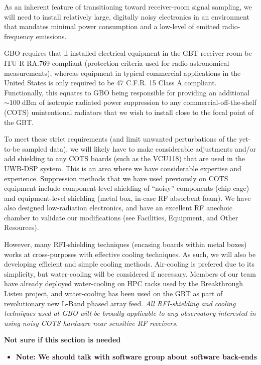\documentclass[10pt]{myNSF}
\begin{document}
As an inherent feature of transitioning toward receiver-room signal
sampling, we will need to install relatively large, digitally noisy
electronics in an environment that mandates minimal power consumption
and a low-level of emitted radio-frequency emissions.

GBO requires that ll installed electrical equipment in the GBT
receiver room be ITU-R RA.769 compliant (protection criteria used for
radio astronomical measurements), whereas equipment in typical
commercial applications in the United States is only required to be 47
C.F.R. 15 Class A compliant. Functionally, this equates to GBO being
responsible for providing an additional $\sim 100\; \mathrm{dBm}$ of
isotropic radiated power suppression to any commercial-off-the-shelf
(COTS) unintentional radiators that we wish to install close to the
focal point of the GBT.  

To meet these strict requirements (and limit unwanted perturbations of
the yet-to-be sampled data), we will likely have to make considerable
adjustments and/or add shielding to any COTS boards (such as the
VCU118) that are used in the UWB-DSP system.  This is an area where we
have considerable expertise and experience. Suppression methods that
we have used previously on COTS equipment include component-level
shielding of ``noisy'' components (chip cage) and equipment-level
shielding (metal box, in-case RF absorbent foam). We have also
designed low-radiation electronics, and have an excellent RF anechoic
chamber to validate our modifications (see Facilities, Equipment, and
Other Resources).

However, many RFI-shielding techniques (encasing boards within metal
boxes) works at cross-purposes with effective cooling techniques. As
such, we will also be developing efficient and simple cooling methods.
Air-cooling is prefered due to its simplicity, but water-cooling will
be considered if necessary.  Members of our team have already deployed
water-cooling on HPC racks used by the Breakthrough Listen project,
and water-cooling has been used on the GBT as part of revolutionary
new L-Band phased array feed.  \emph{All RFI-shielding and cooling
  techniques used at GBO will be broadly applicable to any observatory
  interested in using noisy COTS hardware near sensitive RF
  receivers.}

 \textbf{Not sure if this
  section is needed}
\begin{itemize}
\item{\textbf{Note: We should talk with software group about
      software back-ends}}
\end{itemize}
\end{document}
